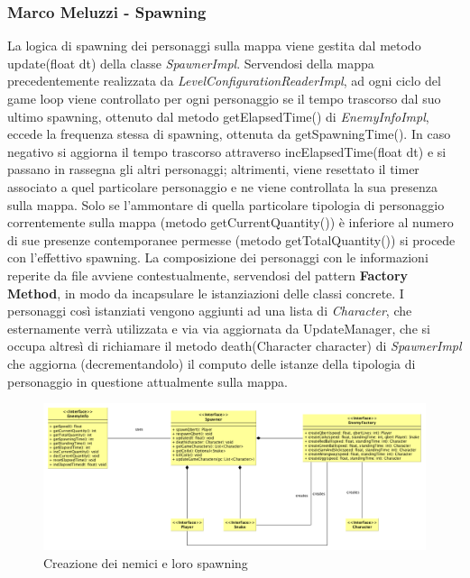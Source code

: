 \documentclass[a4paper,12pt, hidelinks]{report}
\begin{document}
\begin{flushright}
\item\subsubsection{Marco Meluzzi - Spawning}
\end{flushright}

La logica di spawning dei personaggi sulla mappa viene gestita dal metodo update(float dt) della classe \emph{SpawnerImpl}. Servendosi della mappa precedentemente realizzata da \emph{LevelConfigurationReaderImpl}, ad ogni ciclo del game loop viene controllato per ogni personaggio se il tempo trascorso dal suo ultimo spawning, ottenuto dal metodo getElapsedTime() di \emph{EnemyInfoImpl}, eccede la frequenza stessa di spawning, ottenuta da getSpawningTime(). In caso negativo si aggiorna il tempo trascorso attraverso incElapsedTime(float dt) e si passano in rassegna gli altri personaggi; altrimenti, viene resettato il timer associato a quel particolare personaggio e ne viene controllata la sua presenza sulla mappa. Solo se l'ammontare di quella particolare tipologia di personaggio correntemente sulla mappa (metodo getCurrentQuantity()) è inferiore al numero di sue presenze contemporanee permesse (metodo getTotalQuantity()) si procede con l'effettivo spawning. La composizione dei personaggi con le informazioni reperite da file avviene contestualmente, servendosi del pattern \textbf{Factory Method}, in modo da incapsulare le istanziazioni delle classi concrete. I personaggi così istanziati vengono aggiunti ad una lista di \emph{Character}, che esternamente verrà utilizzata e via via aggiornata da UpdateManager, che si occupa altresì di richiamare il metodo death(Character character) di \emph{SpawnerImpl} che aggiorna (decrementandolo) il computo delle istanze della tipologia di personaggio in questione attualmente sulla mappa.

\begin{figure}[H]
\centering{}
\includegraphics[width=\linewidth]{img/CreazioneNemiciESpawner}
\caption{Creazione dei nemici e loro spawning}
\label{img:CreazioneNemiciESpawner}
\end{figure}
\end{document}
